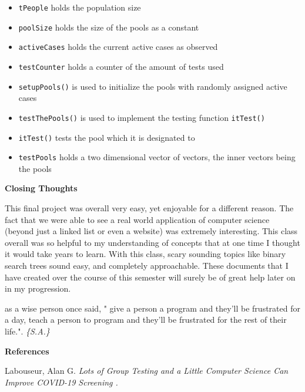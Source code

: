 \documentclass[letterpaper, 10pt]{article}
\begin{document}
\begin{itemize}
    \item \texttt{tPeople} holds the population size
      \item \texttt{poolSize} holds the size of the pools as a constant
      \item \texttt{activeCases} holds the current active cases as observed
      \item \texttt{testCounter} holds a counter of the amount of tests used
      \item \texttt{setupPools()} is used to initialize the pools with randomly assigned active cases
       \item \texttt{testThePools()} is used to implement the testing function \texttt{itTest()}
      \item \texttt{itTest()} tests the pool which it is designated to
      \item \texttt{testPools} holds a two dimensional vector of vectors, the inner vectors being the pools
      
\end{itemize}

\textbf{Closing Thoughts}

This final project was overall very easy, yet enjoyable for a different reason. The fact that we were able to see a real world application of computer science (beyond just a linked list or even a website) was extremely interesting. This class overall was so helpful to my understanding of concepts that at one time I thought it would take years to learn. With this class, scary sounding topics like binary search trees sound easy, and completely approachable. These documents that I have created over the course of this semester will surely be of great help later on in my progression.
\newline

as a wise person once said, "
give a person a program and they'll be
frustrated for a day, teach a person to
program and they'll be frustrated for the
rest of their life.".
 \vspace{.5em}
{\textit{\color{red}\huge{\{S.A.\}}}}
\vspace{1em}



\newpage
\textbf{References}

Labouseur, Alan G. \textit{Lots of Group Testing and a Little Computer Science Can Improve COVID-19 Screening .}
\end{document}
